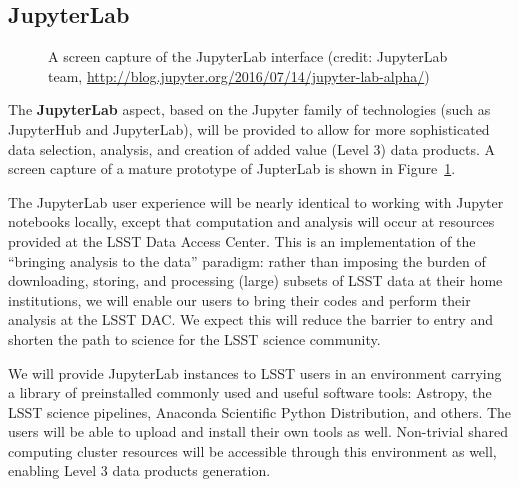 \documentclass[DM,lsstdraft,toc]{lsstdoc}
\begin{document}
\subsection{JupyterLab\label{sec:jupyter}}

\begin{figure}
	\centering
	\caption{A screen capture of the JupyterLab interface (credit: JupyterLab team, \url{http://blog.jupyter.org/2016/07/14/jupyter-lab-alpha/})
		\label{fig:JupyterLab}}
\end{figure}

The {\bf JupyterLab} aspect, based on the Jupyter family of technologies (such as
JupyterHub and JupyterLab), will be provided to allow for more sophisticated
data selection, analysis, and creation of added value (Level 3) data
products. A screen capture of a mature prototype of JupterLab is shown in 
Figure~\ref{fig:JupyterLab}.

The JupyterLab user experience will be nearly identical to working with
Jupyter notebooks locally, except that computation and analysis will occur
at resources provided at the LSST Data Access Center.  This is an
implementation of the “bringing analysis to the data” paradigm: rather
than imposing the burden of downloading, storing, and processing (large)
subsets of LSST data at their home institutions, we will enable our users to
bring their codes and perform their analysis at the LSST DAC.  We expect
this will reduce the barrier to entry and shorten the path to science for
the LSST science community.

We will provide JupyterLab instances to LSST users in an environment carrying a 
library of preinstalled commonly used and useful software tools:
Astropy, the LSST science pipelines, Anaconda Scientific Python Distribution,
and others. The users will be able to upload and install their own tools as well.
Non-trivial shared computing cluster resources will be accessible through this
environment as well, enabling Level 3 data products generation.
\end{document}
